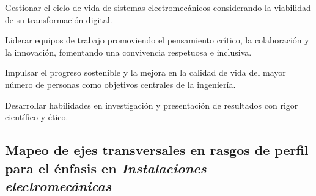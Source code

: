 \begin{cuadroazul}[INS04]
Gestionar el ciclo de vida de sistemas electromecánicos considerando la viabilidad de su transformación digital.
\end{cuadroazul}

\begin{cuadroazul}[LID01]
Liderar equipos de trabajo promoviendo el pensamiento crítico, la colaboración y la innovación, fomentando una convivencia respetuosa e inclusiva.
\end{cuadroazul}

\begin{cuadroazul}[SYC01]
Impulsar el progreso sostenible y la mejora en la calidad de vida del mayor número de personas como objetivos centrales de la ingeniería.
\end{cuadroazul}

\begin{cuadroazul}[IPR01]
Desarrollar habilidades en investigación y presentación de resultados con rigor científico y ético.
\end{cuadroazul}

\subsection*{Mapeo de ejes transversales en rasgos de perfil para el énfasis en \textit{Instalaciones electromecánicas}}

